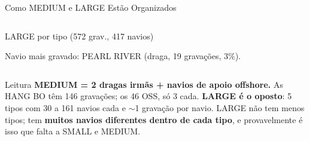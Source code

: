 \documentclass[aspectratio=169]{beamer}
\begin{document}
\begin{frame}{Como MEDIUM e LARGE Estão Organizados}
\begin{columns}[t]
\begin{block}{\small LARGE por tipo (572 grav., 417 navios)}
            \vspace{0.05cm}
            {\tiny Navio mais gravado: PEARL RIVER (draga, 19 gravações, 3\%).\par}
        \end{block}
    \end{columns}
    \vspace{0.1cm}
    \begin{alertblock}{Leitura}
        \scriptsize
        \textbf{MEDIUM = 2 dragas irmãs + navios de apoio offshore.} As HANG BO têm 146 gravações; os 46 OSS, só 3 cada. \textbf{LARGE é o oposto}: 5 tipos com 30 a 161 navios cada e $\sim$1 gravação por navio. LARGE não tem menos tipos; tem \textbf{muitos navios diferentes dentro de cada tipo}, e provavelmente é isso que falta a SMALL e MEDIUM.
    \end{alertblock}
\end{frame}
\end{document}
